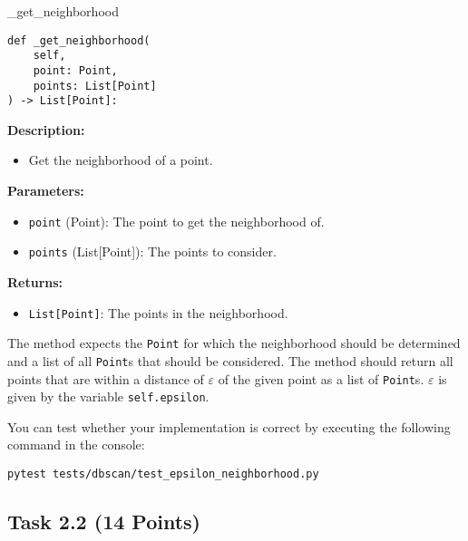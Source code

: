 \documentclass[
english,
smallborders
]{i6prcsht}
\newcommand{\points}[1]{\hfill \color{red}(#1 Points)\color{black}}
\begin{document}
\begin{functionbox}{\_get\_neighborhood}
	\begin{lstlisting}[numbers=none]
def _get_neighborhood(
    self, 
    point: Point, 
    points: List[Point]
) -> List[Point]:
\end{lstlisting}
	
	\textbf{Description:}
	\begin{itemize}[leftmargin=*,topsep=0pt]
		\item Get the neighborhood of a point.
	\end{itemize}
	
	\textbf{Parameters:}
	\begin{itemize}[leftmargin=*,topsep=0pt]
		\item \texttt{point} (Point): The point to get the neighborhood of.
		\item \texttt{points} (List[Point]): The points to consider.
	\end{itemize}
	
	\textbf{Returns:}
	\begin{itemize}[leftmargin=*,topsep=0pt]
		\item \texttt{List[Point]}: The points in the neighborhood.
	\end{itemize}
\end{functionbox}

\vspace*{0.5cm}

The method expects the \texttt{Point} for which the neighborhood should be determined and a list of all \texttt{Point}s that should be considered. The method should return all points that are within a distance of $\varepsilon$ of the given point as a list of \texttt{Point}s. $\varepsilon$ is given by the variable \texttt{self.epsilon}.

You can test whether your implementation is correct by executing the following command in the console:

\vspace*{0.3cm}

\begin{lstlisting}
pytest tests/dbscan/test_epsilon_neighborhood.py
\end{lstlisting}

\newpage

\subsection*{Task 2.2 \points{14}}
\end{document}
